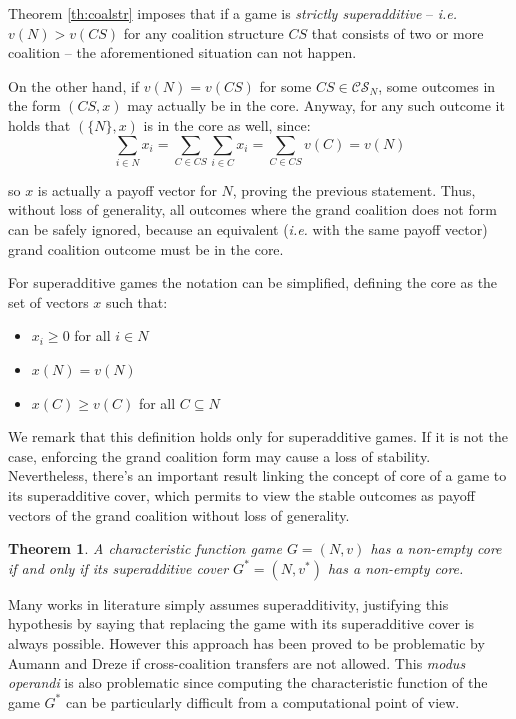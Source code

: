 \documentclass[11pt, twoside, titlepage, a4paper, openright]{report}
\newtheorem{Th}{Theorem}
\begin{document}
\noindent Theorem \ref{th:coalstr} imposes that if a game is \textit{strictly superadditive} -- \textit{i.e.} $v(N) > v(CS)$ for any coalition structure $CS$ that consists of two or more coalition -- the aforementioned situation can not happen.

\noindent On the other hand, if $v(N)=v(CS)$ for some $CS \in \mathcal{CS}_N$, some outcomes in the form $(CS,x)$ may actually be in the core. Anyway, for any such outcome it holds that $(\{N\},x)$ is in the core as well, since: $$\sum_{i \in N}x_i=\sum_{C \in CS}\sum_{i \in C}x_i=\sum_{C \in CS}v(C)=v(N)$$

\noindent so $x$ is actually a payoff vector for $N$, proving the previous statement. Thus, without loss of generality, all outcomes where the grand coalition does not form can be safely ignored, because an equivalent (\textit{i.e.} with the same payoff vector) grand coalition outcome must be in the core.

\noindent For superadditive games the notation can be simplified, defining the core as the set of vectors $x$ such that: 
\begin{itemize}
\item $x_i \geq 0$ for all $i \in N$
\item $x(N) = v(N)$
\item $x(C) \geq v(C)$ for all $C \subseteq N$
\end{itemize}

\noindent We remark that this definition holds only for superadditive games. If it is not the case, enforcing the grand coalition form may cause a loss of stability.
Nevertheless, there's an important result \cite{DBLP:conf/ijcai/GrecoMPS11} linking the concept of core of a game to its superadditive cover, which permits to view the stable outcomes as payoff vectors of the grand coalition without loss of generality.

\begin{Th}
A characteristic function game $G=(N,v)$ has a non-empty core if and only if its superadditive cover $G^*=(N,v^*)$ has a non-empty core.
\end{Th}

\noindent Many works in literature simply assumes superadditivity, justifying this hypothesis by saying that replacing the game with its superadditive cover is always possible. However this approach has been proved to be problematic by Aumann and Dreze \cite{AumannDreze1975} if cross-coalition transfers are not allowed.
\noindent This \textit{modus operandi} is also problematic since computing the characteristic function of the game $G^*$ can be particularly difficult from a computational point of view.
\end{document}

